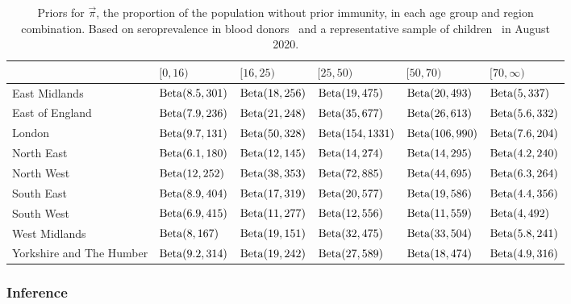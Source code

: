 \documentclass[thesis.tex]{subfiles}
\begin{document}
\begin{landscape}
\begin{table}
\centering
\begin{tabular}{l|lllll}
         & $[0,16)$ & $[16,25)$ & $[25,50)$ & $[50,70)$ & $[70,\infty)$ \\
        \hline
        East Midlands & $\operatorname{Beta}(8.5, 301)$ & $\operatorname{Beta}(18, 256)$ & $\operatorname{Beta}(19, 475)$ & $\operatorname{Beta}(20, 493)$ & $\operatorname{Beta}(5, 337)$ \\
        East of England & $\operatorname{Beta}(7.9, 236)$ & $\operatorname{Beta}(21, 248)$ & $\operatorname{Beta}(35, 677)$ & $\operatorname{Beta}(26, 613)$ & $\operatorname{Beta}(5.6, 332)$ \\
        London & $\operatorname{Beta}(9.7, 131)$ & $\operatorname{Beta}(50, 328)$ & $\operatorname{Beta}(154, 1331)$ & $\operatorname{Beta}(106, 990)$ & $\operatorname{Beta}(7.6, 204)$ \\
        North East & $\operatorname{Beta}(6.1, 180)$ & $\operatorname{Beta}(12, 145)$ & $\operatorname{Beta}(14, 274)$ & $\operatorname{Beta}(14, 295)$ & $\operatorname{Beta}(4.2, 240)$ \\
        North West & $\operatorname{Beta}(12, 252)$ & $\operatorname{Beta}(38, 353)$ & $\operatorname{Beta}(72, 885)$ & $\operatorname{Beta}(44, 695)$ & $\operatorname{Beta}(6.3, 264)$ \\
        South East & $\operatorname{Beta}(8.9, 404)$ & $\operatorname{Beta}(17, 319)$ & $\operatorname{Beta}(20, 577)$ & $\operatorname{Beta}(19, 586)$ & $\operatorname{Beta}(4.4, 356)$ \\
        South West & $\operatorname{Beta}(6.9, 415)$ & $\operatorname{Beta}(11, 277)$ & $\operatorname{Beta}(12, 556)$ & $\operatorname{Beta}(11, 559)$ & $\operatorname{Beta}(4, 492)$ \\
        West Midlands & $\operatorname{Beta}(8, 167)$ & $\operatorname{Beta}(19, 151)$ & $\operatorname{Beta}(32, 475)$ & $\operatorname{Beta}(33, 504)$ & $\operatorname{Beta}(5.8, 241)$ \\
        Yorkshire and The Humber & $\operatorname{Beta}(9.2, 314)$ & $\operatorname{Beta}(19, 242)$ & $\operatorname{Beta}(27, 589)$ & $\operatorname{Beta}(18, 474)$ & $\operatorname{Beta}(4.9, 316)$ \\
    \end{tabular}
\caption{Priors for $\vec{\pi}$, the proportion of the population without prior immunity, in each age group and region combination. Based on seroprevalence in blood donors~\autocite{amirthalingamSeroprevalence} and a representative sample of children~\autocite{ratcliffeCommunity} in August 2020.}
\label{SEIR:table:immunity-prior}
\end{table}
\end{landscape}

\subsubsection{Inference} \label{SEIR:sec:inference}
\end{document}
